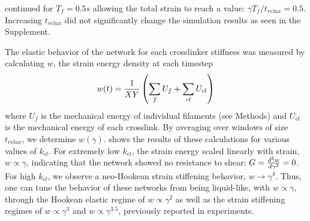 \documentclass[12pt]{article}
\begin{document}
continued for $T_f=0.5s$ allowing the total strain to reach a value:
$\gamma T_f/t_{relax}=0.5$. Increasing $t_{relax}$ did not significantly change 
the simulation results as seen in the Supplement.
\par
The elastic behavior of the network for each crosslinker stiffness was measured
by calculating $w$, the strain energy density at each timestep
\begin{equation}
  w(t) = {1\over X Y}\left(\sum_f{ U_f}+\sum_{cl}{U_{cl}}\right)
  \label{eqn:sed}
\end{equation}
where $U_f$ is the mechanical energy of individual filaments (see Methods) and 
$U_{cl}$ is the mechanical energy of each crosslink. By averaging
over windows of size $t_{relax}$, we determine $w(\gamma)$.  
shows the results of these calculations for various values of $k_{cl}$. 
For extremely low $k_{cl}$, the strain energy
scaled linearly with strain, $w\propto \gamma$, indicating that the network 
showed no resistance to shear: $G={d^2w\over d\gamma^2}=0$. For high $k_{cl}$, 
we observe a neo-Hookean strain stiffening behavior, $w\rightarrow\gamma^4$\cite{shokef2012}. 
Thus, one can tune the behavior of these networks from being liquid-like, 
with $w\propto\gamma$, through the Hookean elastic regime of $w\propto\gamma^2$ 
as well as the strain stiffening regimes of $w\propto\gamma^3$ and
$w\propto\gamma^{3.5}$, previously reported in experiments\cite{gardel2004, kasza2009}. 
\end{document}
